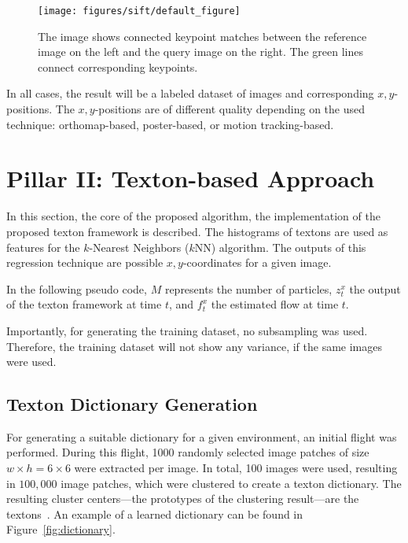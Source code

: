\begin{figure}[h!]
\begin{center}
\texttt{[image: figures/sift/default\_figure]}
\caption{{\label{fig:homography} The
    image shows connected keypoint matches between the reference image
    on the left and the query image on the right. The green lines
    connect corresponding keypoints.%
}}
\end{center}
\end{figure}

In all cases, the result will be a labeled dataset of images and corresponding $x,y$-positions. The $x,y$-positions are of different quality depending on the used technique: orthomap-based, poster-based, or motion tracking-based. 


\section{Pillar II: Texton-based Approach}
\label{sec:textons}

In this section, the core of the proposed algorithm, the
implementation of the proposed texton framework is described.  The
histograms of textons are used as features for the $k$-Nearest
Neighbors ($k$NN) algorithm. The outputs of this regression technique
are possible $x,y$-coordinates for a given image.

In the following pseudo code, $M$ represents the number of particles,
$z_t^x$ the output of the texton framework at time $t$, and $f_t^x$
the estimated flow at time $t$.


Importantly, for generating the training dataset, no subsampling was
used. Therefore, the training dataset will not show any variance, if
the same images were used.

\subsection{Texton Dictionary Generation}
\label{sec:text-dict-gener}

For generating a suitable dictionary for a given environment, an
initial flight was performed. During this flight, 1000 randomly
selected image patches of size $w \times h = 6 \times 6$ were
extracted per image. In total, 100 images were used, resulting in
$100,000$ image patches, which were clustered to create a texton
dictionary. The resulting cluster centers---the prototypes of the
clustering result---are the textons~\cite{varma2003texture}. An
example of a learned dictionary can be found in
Figure~\ref{fig:dictionary}.

